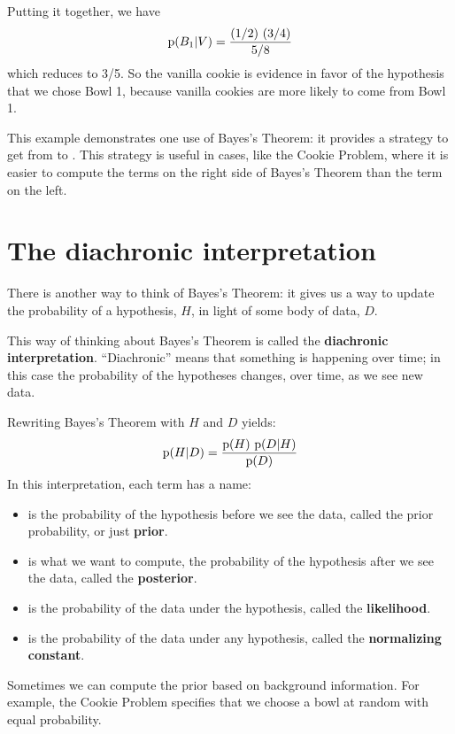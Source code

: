 \documentclass[12pt]{book}
\begin{document}
Putting it together, we have 
%
\[ \mathrm{p}(B_1|V) = \frac{(1/2)~(3/4)}{5/8} \]
%
which reduces to 3/5.  So the vanilla cookie is evidence in favor of
the hypothesis that we chose Bowl 1, because vanilla cookies are more
likely to come from Bowl 1.

This example demonstrates one use of Bayes's Theorem: it provides
a strategy to get from  to .  This strategy is useful
in cases, like the Cookie Problem, where it is easier to compute
the terms on the right side of Bayes's Theorem than the term on the
left.


\section{The diachronic interpretation}

There is another way to think of Bayes's Theorem: it gives us a
way to update the probability of a hypothesis, $H$, in light of
some body of data, $D$.

This way of thinking about Bayes's Theorem is called the
{\bf diachronic interpretation}.  ``Diachronic'' means that something
is happening over time; in this case
the probability of the hypotheses changes, over time, as
we see new data.

Rewriting Bayes's Theorem with $H$ and $D$ yields:
%
\[ \mathrm{p}(H|D) = \frac{\mathrm{p}(H)~\mathrm{p}(D|H)}{\mathrm{p}(D)} \]
%
In this interpretation, each term has a name:

\begin{itemize}

\item {} is the probability of the hypothesis before we see
the data, called the prior probability, or just {\bf prior}.

\item {} is what we want to compute, the probability of
the hypothesis after we see the data, called the {\bf posterior}.
 
\item {} is the probability of the data under the hypothesis,
called the {\bf likelihood}.

\item {} is the probability of the data under any hypothesis,
called the {\bf normalizing constant}.

\end{itemize}

Sometimes we can compute the prior based on background
information.  For example, the Cookie Problem specifies that we choose
a bowl at random with equal probability.
\end{document}
